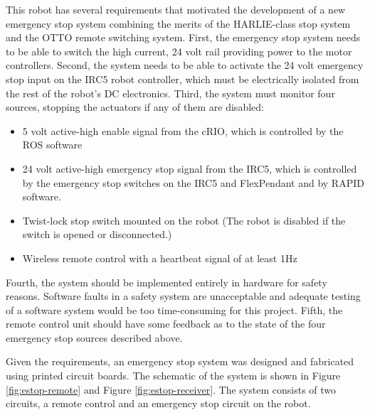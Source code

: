 \documentclass[]{cwru} %
\begin{document}
This robot has several requirements that motivated the development of a
new emergency stop system combining the merits of the HARLIE-class stop
system and the OTTO remote switching system. First, the emergency stop
system needs to be able to switch the high current, 24 volt rail
providing power to the motor controllers. Second, the system needs to be
able to activate the 24 volt emergency stop input on the IRC5 robot
controller, which must be electrically isolated from the rest of the
robot's DC electronics. Third, the system must monitor four sources,
stopping the actuators if any of them are disabled:

\begin{itemize}
\item
  5 volt active-high enable signal from the cRIO, which is controlled by
  the ROS software
\item
  24 volt active-high emergency stop signal from the IRC5, which is
  controlled by the emergency stop switches on the IRC5 and FlexPendant
  and by RAPID software.
\item
  Twist-lock stop switch mounted on the robot (The robot is disabled if
  the switch is opened or disconnected.)
\item
  Wireless remote control with a heartbeat signal of at least 1Hz
\end{itemize}

Fourth, the system should be implemented entirely in hardware for safety
reasons. Software faults in a safety system are unacceptable and
adequate testing of a software system would be too time-consuming for
this project. Fifth, the remote control unit should have some feedback
as to the state of the four emergency stop sources described above.

Given the requirements, an emergency stop system was designed and
fabricated using printed circuit boards. The schematic of the system is
shown in Figure \ref{fig:estop-remote} and Figure \ref{fig:estop-receiver}. 
The system consists of two circuits, a remote control and an emergency stop 
circuit on the robot.
\end{document}
